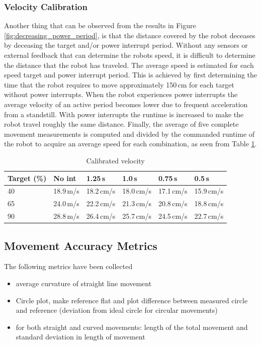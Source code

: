 \subsubsection{Velocity Calibration}
Another thing that can be observed from the results in Figure \ref{fig:decreasing_power_period}, is that the distance covered by the robot deceases by deceasing the target and/or power interrupt period.
Without any sensors or external feedback that can determine the robots speed, it is difficult to determine the distance that the robot has traveled.
The average speed is estimated for each speed target and power interrupt period.
This is achieved by first determining the time that the robot requires to move approximately 150\,cm for each target without power interrupts.
When the robot experiences power interrupts the average velocity of an active period becomes lower due to frequent acceleration from a standstill.
With power interrupts the runtime is increased to make the robot travel roughly the same distance.
Finally, the average of five complete movement measurements is computed and divided by the commanded runtime of the robot to acquire an average speed for each combination, as seen from Table \ref{tab:val_calib}.


\begin{table}[t]
	\centering
	\small
	\caption{Calibrated velocity}
	\label{tab:val_calib}
	\begin{tabular}{|l|l|l|l|l|l|}
		\hline
		Target (\%) & No int & 1.25\,s & 1.0\,s & 0.75\,s & 0.5\,s \\
		\hline \hline
		 40 & 18.9\,m/s & 18.2\,cm/s & 18.0\,cm/s & 17.1\,cm/s & 15.9\,cm/s \\
	     65 & 24.0\,m/s & 22.2\,cm/s & 21.3\,cm/s & 20.8\,cm/s & 18.8\,cm/s \\
		 90 & 28.8\,m/s & 26.4\,cm/s & 25.7\,cm/s & 24.5\,cm/s & 22.7\,cm/s \\
		\hline
	\end{tabular}
\end{table}

\subsection{Movement Accuracy Metrics}
The following metrics have been collected

\begin{itemize}
	\item average curvature of straight line movement
	\item Circle plot, make reference flat and plot difference between measured circle and reference (deviation from ideal circle for circular movements)
	\item for both straight and curved movements: length of the total movement and  standard deviation in length of movement
\end{itemize}


